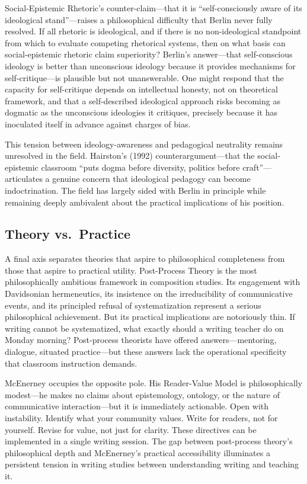 \documentclass[12pt]{article}
\begin{document}
Social-Epistemic Rhetoric's counter-claim---that it is ``self-consciously aware of its ideological stand''---raises a philosophical difficulty that Berlin never fully resolved. If all rhetoric is ideological, and if there is no non-ideological standpoint from which to evaluate competing rhetorical systems, then on what basis can social-epistemic rhetoric claim superiority? Berlin's answer---that self-conscious ideology is better than unconscious ideology because it provides mechanisms for self-critique---is plausible but not unanswerable. One might respond that the capacity for self-critique depends on intellectual honesty, not on theoretical framework, and that a self-described ideological approach risks becoming as dogmatic as the unconscious ideologies it critiques, precisely because it has inoculated itself in advance against charges of bias.

This tension between ideology-awareness and pedagogical neutrality remains unresolved in the field. Hairston's (1992) counterargument---that the social-epistemic classroom ``puts dogma before diversity, politics before craft''---articulates a genuine concern that ideological pedagogy can become indoctrination. The field has largely sided with Berlin in principle while remaining deeply ambivalent about the practical implications of his position.

\subsection{Theory vs.\ Practice}

A final axis separates theories that aspire to philosophical completeness from those that aspire to practical utility. Post-Process Theory is the most philosophically ambitious framework in composition studies. Its engagement with Davidsonian hermeneutics, its insistence on the irreducibility of communicative events, and its principled refusal of systematization represent a serious philosophical achievement. But its practical implications are notoriously thin. If writing cannot be systematized, what exactly should a writing teacher do on Monday morning? Post-process theorists have offered answers---mentoring, dialogue, situated practice---but these answers lack the operational specificity that classroom instruction demands.

McEnerney occupies the opposite pole. His Reader-Value Model is philosophically modest---he makes no claims about epistemology, ontology, or the nature of communicative interaction---but it is immediately actionable. Open with instability. Identify what your community values. Write for readers, not for yourself. Revise for value, not just for clarity. These directives can be implemented in a single writing session. The gap between post-process theory's philosophical depth and McEnerney's practical accessibility illuminates a persistent tension in writing studies between understanding writing and teaching it.
\end{document}
